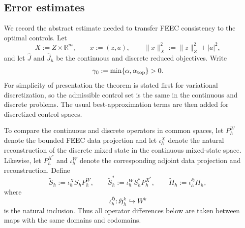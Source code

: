 \documentclass{article}
\newcommand{\R} {\mathbb R}
\newcommand{\HH}{\mathfrak H}
\begin{document}
\subsection{Error estimates}
\label{sec:error-estimates}

We record the abstract estimate needed to transfer FEEC consistency to the optimal controls.  Let
\[
  X:=Z\times\R^m,
  \qquad
  x:=(z,a),
  \qquad
  \|x\|_X^2:=\|z\|_Z^2+|a|^2,
\]
and let $\widehat J$ and $\widehat J_h$ be the continuous and discrete reduced objectives.  Write
\[
  \gamma_0:=\min\{\alpha,\alpha_{\rm top}\}>0.
\]
For simplicity of presentation the theorem is stated first for variational discretization, so the admissible control set is the same in the continuous and discrete problems.  The usual best-approximation terms are then added for discretized control spaces.

To compare the continuous and discrete operators in common spaces, let
$P_h^W$ denote the bounded FEEC data projection and let
$\iota_h^X$ denote the natural reconstruction of the discrete mixed
state in the continuous mixed-state space.  Likewise, let
$P_h^{X^*}$ and $\iota_h^W$ denote the corresponding adjoint data
projection and reconstruction.  Define
\[
\widetilde S_h:=\iota_h^X S_hP_h^W,
\qquad
\widetilde S_h^*:=\iota_h^W S_h^*P_h^{X^*},
\qquad
\widetilde H_h:=\iota_h^{\HH}H_h,
\]
where
\[
\iota_h^{\HH}:\HH_h^k\hookrightarrow W^k
\]
is the natural inclusion.
Thus all operator differences below are taken between maps with the
same domains and codomains.
\end{document}
